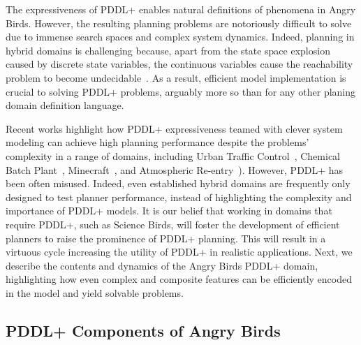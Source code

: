 
The expressiveness of PDDL+ enables natural definitions of phenomena in Angry Birds. However, the resulting planning problems are notoriously difficult to solve due to immense search spaces and complex system dynamics. Indeed, planning in hybrid domains is challenging because, apart from the state space explosion caused by discrete state variables, the continuous variables cause the reachability problem to become undecidable~\cite{alur95algorithmic}. As a result, efficient model implementation is crucial to solving PDDL+ problems, arguably more so than for any other planing domain definition language. 


Recent works highlight how PDDL+ expressiveness teamed with clever system modeling can achieve high planning performance despite the problems' complexity in a range of domains, including Urban Traffic Control~\cite{vallati-et-al:aaai-2016}, Chemical Batch Plant~\cite{della2010pddl+}, Minecraft~\cite{roberts2017automated}, and Atmospheric Re-entry~\cite{piotrowski2018heuristics}). However, PDDL+ has been often misused. Indeed, even established hybrid domains are frequently only designed to test planner performance, instead of highlighting the complexity and importance of PDDL+ models. It is our belief that working in domains that require PDDL+, such as Science Birds, will foster the development of efficient planners to raise the prominence of PDDL+ planning. 
This will result in a virtuous cycle increasing the utility of PDDL+ in realistic applications. Next, we describe the contents and dynamics of the Angry Birds PDDL+ domain, highlighting how even complex and composite features can be efficiently encoded in the model and yield solvable problems. 

\subsection{PDDL+ Components of Angry Birds}

